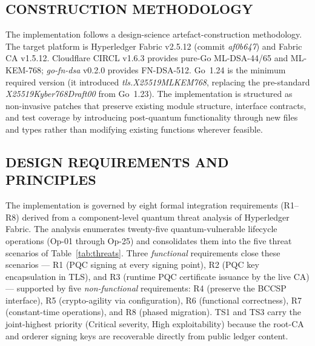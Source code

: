 \documentclass{ieeetj}
\begin{document}
\subsection{CONSTRUCTION METHODOLOGY}
\label{sec:method_construction}

The implementation follows a design-science artefact-construction
methodology. The target platform is Hyperledger Fabric v2.5.12 (commit
\textit{af0b647}) and Fabric CA v1.5.12. Cloudflare CIRCL v1.6.3
provides pure-Go ML-DSA-44/65 and ML-KEM-768; \textit{go-fn-dsa} v0.2.0
provides FN-DSA-512. Go~1.24 is the minimum required version (it
introduced \textit{tls.X25519MLKEM768}, replacing the pre-standard
\textit{X25519Kyber768Draft00} from Go~1.23). The implementation is
structured as non-invasive patches that preserve existing module
structure, interface contracts, and test coverage by introducing
post-quantum functionality through new files and types rather than
modifying existing functions wherever feasible.

\subsection{DESIGN REQUIREMENTS AND PRINCIPLES}
\label{sec:method_principles}

The implementation is governed by eight formal integration
requirements (R1--R8) derived from a component-level quantum threat
analysis of Hyperledger Fabric. The analysis enumerates twenty-five
quantum-vulnerable lifecycle operations (Op-01 through Op-25) and
consolidates them into the five threat scenarios of
Table~\ref{tab:threats}. Three \emph{functional} requirements close
these scenarios --- R1 (PQC signing at every signing point), R2 (PQC
key encapsulation in TLS), and R3 (runtime PQC certificate issuance by
the live CA) --- supported by five \emph{non-functional} requirements:
R4 (preserve the BCCSP interface), R5 (crypto-agility via
configuration), R6 (functional correctness), R7 (constant-time
operations), and R8 (phased migration). TS1 and TS3 carry the
joint-highest priority (Critical severity, High exploitability)
because the root-CA and orderer signing keys are recoverable directly
from public ledger content.
\end{document}
